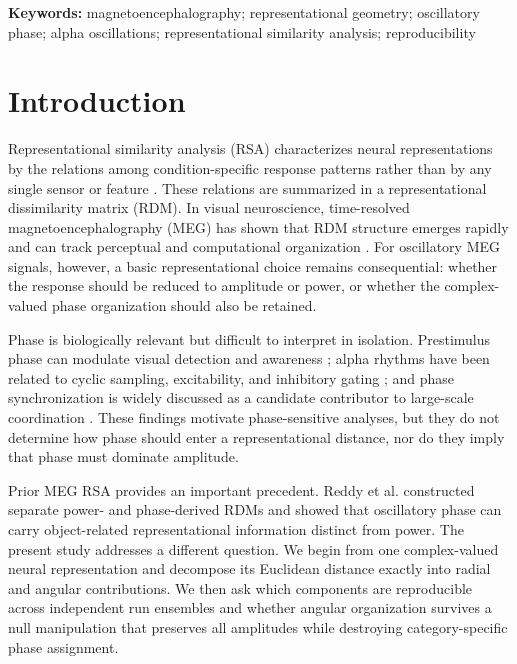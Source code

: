 \documentclass[11pt]{article}
\begin{document}
\textbf{Keywords:} magnetoencephalography; representational geometry; oscillatory phase; alpha oscillations; representational similarity analysis; reproducibility

\linenumbers

\section{Introduction}
Representational similarity analysis (RSA) characterizes neural representations by the relations among condition-specific response patterns rather than by any single sensor or feature \citep{Kriegeskorte2008,KriegeskorteKievit2013}. These relations are summarized in a representational dissimilarity matrix (RDM). In visual neuroscience, time-resolved magnetoencephalography (MEG) has shown that RDM structure emerges rapidly and can track perceptual and computational organization \citep{Cichy2014,Wardle2016}. For oscillatory MEG signals, however, a basic representational choice remains consequential: whether the response should be reduced to amplitude or power, or whether the complex-valued phase organization should also be retained.

Phase is biologically relevant but difficult to interpret in isolation. Prestimulus phase can modulate visual detection and awareness \citep{Busch2009,Mathewson2009}; alpha rhythms have been related to cyclic sampling, excitability, and inhibitory gating \citep{VanRullen2016,JensenMazaheri2010}; and phase synchronization is widely discussed as a candidate contributor to large-scale coordination \citep{Palva2018}. These findings motivate phase-sensitive analyses, but they do not determine how phase should enter a representational distance, nor do they imply that phase must dominate amplitude.

Prior MEG RSA provides an important precedent. Reddy et al. \citep{Reddy2021} constructed separate power- and phase-derived RDMs and showed that oscillatory phase can carry object-related representational information distinct from power. The present study addresses a different question. We begin from one complex-valued neural representation and decompose its Euclidean distance exactly into radial and angular contributions. We then ask which components are reproducible across independent run ensembles and whether angular organization survives a null manipulation that preserves all amplitudes while destroying category-specific phase assignment.
\end{document}

